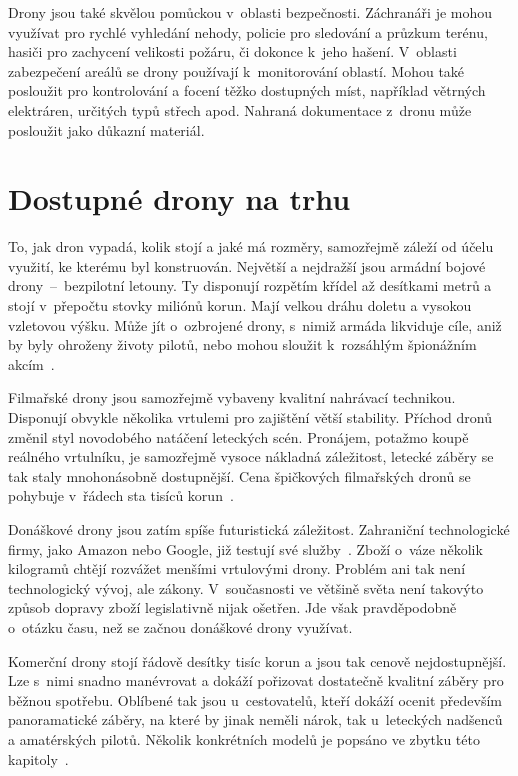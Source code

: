 Drony jsou také skvělou pomůckou v~oblasti bezpečnosti. Záchranáři je mohou využívat pro rychlé vyhledání nehody, policie pro sledování a průzkum terénu, hasiči pro zachycení velikosti požáru, či dokonce k~jeho hašení. V~oblasti zabezpečení areálů se drony používají k~monitorování oblastí. Mohou také posloužit pro kontrolování a focení těžko dostupných míst, například větrných elektráren, určitých typů střech apod. Nahraná dokumentace z~dronu může posloužit jako důkazní materiál.


\section{Dostupné drony na trhu}

To, jak dron vypadá, kolik stojí a jaké má rozměry, samozřejmě záleží od účelu využití, ke kterému byl konstruován. Největší a nejdražší jsou armádní bojové drony~--~bezpilotní letouny. Ty disponují rozpětím křídel až desítkami metrů a stojí v~přepočtu stovky miliónů korun. Mají velkou dráhu doletu a vysokou vzletovou výšku. Může jít o~ozbrojené drony, s~nimiž armáda likviduje cíle, aniž by byly ohroženy životy pilotů, nebo mohou sloužit k~rozsáhlým špionážním akcím~\cite{articleDroneUsage}.

Filmařské drony jsou samozřejmě vybaveny kvalitní nahrávací technikou. Disponují obvykle několika vrtulemi pro zajištění větší stability. Příchod dronů změnil styl novodobého natáčení leteckých scén. Pronájem, potažmo koupě reálného vrtulníku, je samozřejmě vysoce nákladná záležitost, letecké záběry se tak staly mnohonásobně dostupnější. Cena špičkových filmařských dronů se pohybuje v~řádech sta tisíců korun~\cite{articleDroneUsage}.

Donáškové drony jsou zatím spíše futuristická záležitost. Zahraniční technologické firmy, jako Amazon nebo Google, již testují své služby~\cite{droneDelivery}. Zboží o~váze několik kilogramů chtějí rozvážet menšími vrtulovými drony. Problém ani tak není technologický vývoj, ale zákony. V~současnosti ve většině světa není takovýto způsob dopravy zboží legislativně nijak ošetřen. Jde však pravděpodobně o~otázku času, než se začnou donáškové drony využívat.

Komerční drony stojí řádově desítky tisíc korun a jsou tak cenově nejdostupnější. Lze s~nimi snadno manévrovat a dokáží pořizovat dostatečně kvalitní záběry pro běžnou spotřebu. Oblíbené tak jsou u~cestovatelů, kteří dokáží ocenit především panoramatické záběry, na které by jinak neměli nárok, tak u~leteckých nadšenců a amatérských pilotů. Několik konkrétních modelů je popsáno ve zbytku této kapitoly~\cite{articleDji}.

